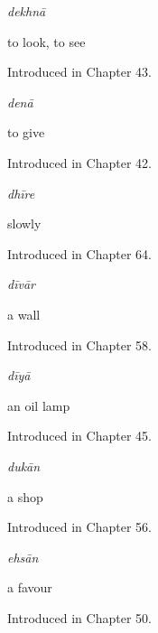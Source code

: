 \noindent\begin{minipage}[t]{\linewidth}
\raggedright
\textbf{}\enspace\emph{dekhnā}\par
\small to look, to see\par
\footnotesize Introduced in Chapter 43.
\end{minipage}\par\medskip

\noindent\begin{minipage}[t]{\linewidth}
\raggedright
\textbf{}\enspace\emph{denā}\par
\small to give\par
\footnotesize Introduced in Chapter 42.
\end{minipage}\par\medskip

\noindent\begin{minipage}[t]{\linewidth}
\raggedright
\textbf{}\enspace\emph{dhīre}\par
\small slowly\par
\footnotesize Introduced in Chapter 64.
\end{minipage}\par\medskip

\noindent\begin{minipage}[t]{\linewidth}
\raggedright
\textbf{}\enspace\emph{dīvār}\par
\small a wall\par
\footnotesize Introduced in Chapter 58.
\end{minipage}\par\medskip

\noindent\begin{minipage}[t]{\linewidth}
\raggedright
\textbf{}\enspace\emph{dīyā}\par
\small an oil lamp\par
\footnotesize Introduced in Chapter 45.
\end{minipage}\par\medskip

\noindent\begin{minipage}[t]{\linewidth}
\raggedright
\textbf{}\enspace\emph{dukān}\par
\small a shop\par
\footnotesize Introduced in Chapter 56.
\end{minipage}\par\medskip

\noindent\begin{minipage}[t]{\linewidth}
\raggedright
\textbf{}\enspace\emph{ehsān}\par
\small a favour\par
\footnotesize Introduced in Chapter 50.
\end{minipage}\par\medskip

